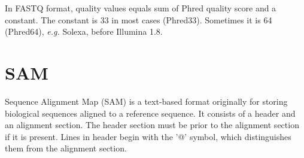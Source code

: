 \documentclass[11pt]{article}
\begin{document}
\newline

In FASTQ format, quality values equals sum of Phred quality score and a constant. 
The constant is 33 in most cases (Phred33). 
Sometimes it is 64 (Phred64), \textit{e.g.} Solexa, before Illumina 1.8. 

\section{SAM}
Sequence Alignment Map (SAM) is a text-based format originally for storing biological sequences aligned to a reference sequence. 
It consists of a header and an alignment section. 
The header section must be prior to the alignment section if it is present. 
Lines in header begin with the '@' symbol, which distinguishes them from the alignment section. 

\newline
\end{document}
